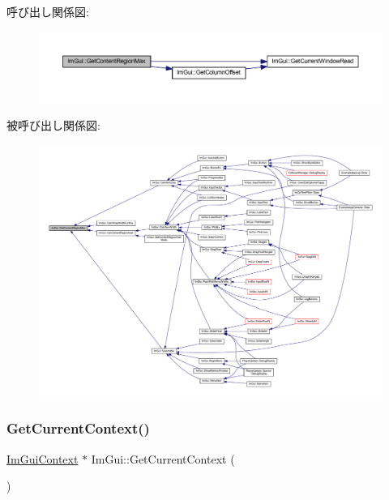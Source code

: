 呼び出し関係図\+:\nopagebreak
\begin{figure}[H]
\begin{center}
\leavevmode
\includegraphics[width=350pt]{namespace_im_gui_a0a4dbfabbfa45d74319ef541962ce2eb_cgraph}
\end{center}
\end{figure}
被呼び出し関係図\+:\nopagebreak
\begin{figure}[H]
\begin{center}
\leavevmode
\includegraphics[width=350pt]{namespace_im_gui_a0a4dbfabbfa45d74319ef541962ce2eb_icgraph}
\end{center}
\end{figure}
\mbox{\label{namespace_im_gui_af557a6de5538099a0f6047eb994bbf42}} 
\subsubsection{\texorpdfstring{Get\+Current\+Context()}{GetCurrentContext()}}
{\footnotesize\ttfamily \mbox{\hyperlink{struct_im_gui_context}{Im\+Gui\+Context}} $\ast$ Im\+Gui\+::\+Get\+Current\+Context (\begin{DoxyParamCaption}{ }\end{DoxyParamCaption})}



